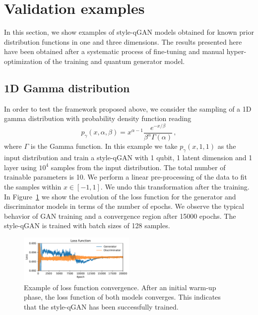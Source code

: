\documentclass[twocolumn,preprintnumbers,superscriptaddress]{revtex4-2}
\begin{document}
\section{Validation examples}
\label{sec:validation}

In this section, we show examples of style-qGAN models obtained for known prior
distribution functions in one and three dimensions. The results presented here
have been obtained after a systematic process of fine-tuning and manual
hyper-optimization of the training and quantum generator model.

\subsection{1D Gamma distribution}
\label{sec:gamma}

In order to test the framework proposed above, we
consider the sampling of a 1D gamma distribution with probability density
function reading
\begin{equation}
  p_\gamma (x, \alpha, \beta) = x^{\alpha-1} \frac{e^{-x/\beta}}{\beta^\alpha \Gamma(\alpha)}\,,
\end{equation}
where $\Gamma$ is the Gamma function. In this example we take $p_\gamma (x, 1,
1)$ as the input distribution and train a style-qGAN with 1 qubit, 1 latent dimension and
1 layer using $10^4$ samples from the input distribution. The total number of trainable parameters is 10. We perform a linear pre-processing of the data to fit the samples within $x \in [-1, 1]$. We undo this transformation after the training.
%
In Figure~\ref{fig:loss} we show the evolution of the loss function for the
generator and discriminator models in terms of the number of epochs. We observe the
typical behavior of GAN training and a convergence region after 15000 epochs.
%
The style-qGAN is trained with batch sizes of 128 samples.

\begin{figure}
  \includegraphics[width=0.5\textwidth]{plots/1Dgamma/1Dgamma_loss.pdf}
  \caption{\label{fig:loss}Example of loss function convergence. After an initial warm-up phase, the loss function of both models converges. This indicates that the style-qGAN has been successfully trained.}
\end{figure}
\end{document}
